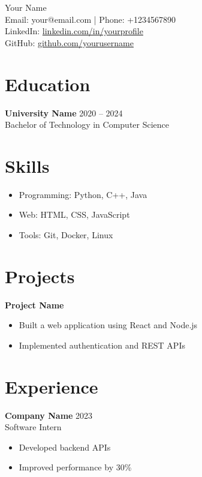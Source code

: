\documentclass[a4paper,10pt]{article}
\begin{document}
\begin{center}
    {\LARGE Your Name} \\
    \vspace{2mm}
    Email: your@email.com | Phone: +1234567890 \\
    LinkedIn: \href{https://linkedin.com/in/yourprofile}{linkedin.com/in/yourprofile} \\
    GitHub: \href{https://github.com/yourusername}{github.com/yourusername}
\end{center}

\section*{Education}
\textbf{University Name} \hfill 2020 -- 2024 \\
Bachelor of Technology in Computer Science

\section*{Skills}
\begin{itemize}[noitemsep]
    \item Programming: Python, C++, Java
    \item Web: HTML, CSS, JavaScript
    \item Tools: Git, Docker, Linux
\end{itemize}

\section*{Projects}
\textbf{Project Name} \\
\begin{itemize}[noitemsep]
    \item Built a web application using React and Node.js
    \item Implemented authentication and REST APIs
\end{itemize}

\section*{Experience}
\textbf{Company Name} \hfill 2023 \\
Software Intern
\begin{itemize}[noitemsep]
    \item Developed backend APIs
    \item Improved performance by 30\%
\end{itemize}
\end{document}
